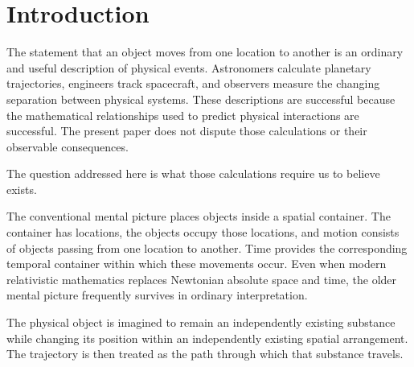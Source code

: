 \documentclass[12pt,onecolumn]{article}
\begin{document}
\begin{abstract}
The paper distinguishes invariant quantities associated with individual worldlines, including proper acceleration and accumulated proper time, from spatial and temporal relationships assigned between physical systems. It advances a conditional no-go: given the absence of independently existing spatial positions and traveler-substances, independent substance displacement has no physical referent. Motion remains a valid description of lawful relational change, but it does not establish the existence of a substance traveling through a completed spatial container.

The result changes no equations or predictions of special or general relativity. Its contribution is ontological: there is one present physical actuality, constituted by lawful relationships whose configurations change, while individual constituents accumulate their own proper-time histories. Neither motion nor time requires an independently existing spatial or temporal container.
\end{abstract}

\section{Introduction}

The statement that an object moves from one location to another is an ordinary and useful description of physical events. Astronomers calculate planetary trajectories, engineers track spacecraft, and observers measure the changing separation between physical systems. These descriptions are successful because the mathematical relationships used to predict physical interactions are successful. The present paper does not dispute those calculations or their observable consequences.

The question addressed here is what those calculations require us to believe exists.

The conventional mental picture places objects inside a spatial container. The container has locations, the objects occupy those locations, and motion consists of objects passing from one location to another. Time provides the corresponding temporal container within which these movements occur. Even when modern relativistic mathematics replaces Newtonian absolute space and time, the older mental picture frequently survives in ordinary interpretation.

The physical object is imagined to remain an independently existing substance while changing its position within an independently existing spatial arrangement. The trajectory is then treated as the path through which that substance travels.
\end{document}
